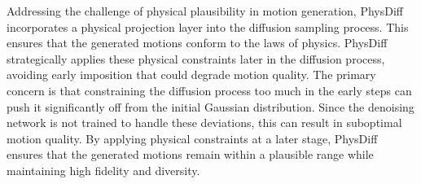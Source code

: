 Addressing the challenge of physical plausibility in motion generation, PhysDiff \cite{yuan2023physdiff} incorporates a physical projection layer into the diffusion sampling process. This ensures that the generated motions conform to the laws of physics. PhysDiff strategically applies these physical constraints later in the diffusion process, avoiding early imposition that could degrade motion quality. The primary concern is that constraining the diffusion process too much in the early steps can push it significantly off from the initial Gaussian distribution. Since the denoising network is not trained to handle these deviations, this can result in suboptimal motion quality. By applying physical constraints at a later stage, PhysDiff ensures that the generated motions remain within a plausible range while maintaining high fidelity and diversity.






